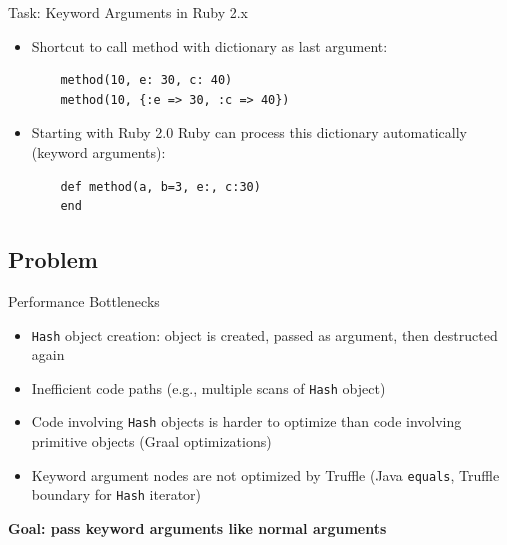\documentclass[xcolor=dvipsname,handout]{beamer} %
\begin{document}
\begin{frame}[fragile]{Task: Keyword Arguments in Ruby 2.x}

\begin{itemize}
 \item Shortcut to call method with dictionary as last argument:
    \begin{lstlisting}
    method(10, e: 30, c: 40)
    method(10, {:e => 30, :c => 40})
    \end{lstlisting}
  \item Starting with Ruby 2.0 Ruby can process this dictionary automatically (keyword arguments):
    \begin{lstlisting}
    def method(a, b=3, e:, c:30)
    end
    \end{lstlisting}
\end{itemize}
\end{frame}


\subsection{Problem}

\begin{frame}{Performance Bottlenecks}
\begin{itemize}
    \item \lstinline{Hash} object creation: object is created, passed as argument, then destructed again
    \item Inefficient code paths (e.g., multiple scans of \lstinline{Hash} object)
    \item Code involving \lstinline{Hash} objects is harder to optimize than code involving primitive objects (Graal optimizations)
    \item Keyword argument nodes are not optimized by Truffle (Java \lstinline{equals}, Truffle boundary for \lstinline{Hash} iterator)
\end{itemize}

\begin{table}
    \centering
\textbf{Goal: pass keyword arguments like normal arguments}
\end{table}
\end{frame}
\end{document}

